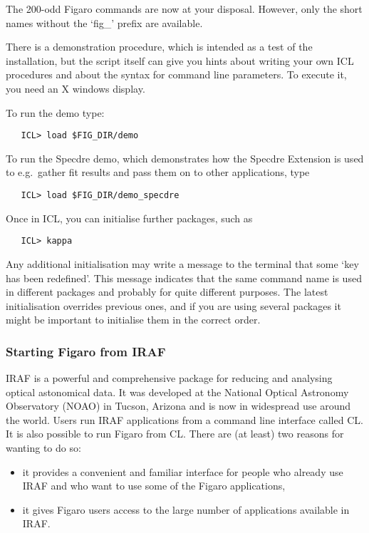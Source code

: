    The 200-odd Figaro commands are now at your disposal. However, only
   the short names without the `fig\_' prefix are available.

   There is a demonstration procedure, which is intended as a test of 
   the installation, but the
   script itself can give you hints about writing your own ICL
   procedures and about the syntax for command line parameters. 
   To execute it, you need an X windows display. 

   To run the demo type:

\begin{verbatim}
   ICL> load $FIG_DIR/demo
\end{verbatim}

   To run the Specdre demo, which  
   demonstrates how the Specdre Extension is used to e.g.\ gather fit
   results and pass them on to other applications, type

\begin{verbatim}
   ICL> load $FIG_DIR/demo_specdre
\end{verbatim}

   Once in ICL, you can initialise further packages, such as

\begin{verbatim}
   ICL> kappa
\end{verbatim}

   Any additional initialisation may write a message to the terminal that
   some `key has been redefined'.  This message indicates that the same
   command name is used in different packages and probably for quite
   different purposes.  The latest initialisation overrides previous ones,
   and if you are using several packages it might be important to
   initialise them in the correct order.

\subsubsection{Starting Figaro from IRAF}

   IRAF is a powerful and comprehensive package for reducing and
   analysing optical astonomical data.  It was developed at the
   National Optical Astronomy Observatory (NOAO) in Tucson, Arizona and
   is now in widespread use around the world.  Users run IRAF
   applications from a command line interface called CL.  It is also
   possible to run Figaro from CL.  There are (at least) two reasons
   for wanting to do so:

  \begin{itemize}

    \item it provides a convenient and familiar interface for people
     who already use IRAF and who want to use some of the Figaro
     applications,

    \item it gives Figaro users access to the large number of
     applications available in IRAF.

  \end{itemize}

